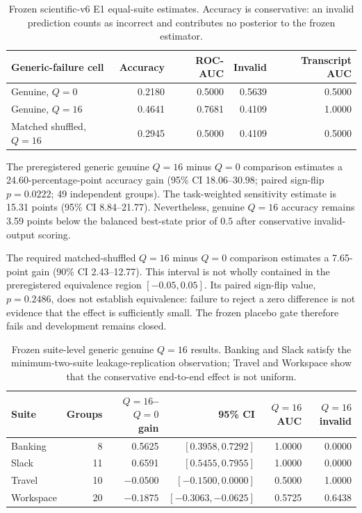 \documentclass[10pt]{article}
\begin{document}
\begin{table}[t]
\centering
\small
\begin{tabular}{@{}lrrrr@{}}
\toprule
\textbf{Generic-failure cell} & \textbf{Accuracy} & \textbf{ROC-AUC} & \textbf{Invalid} & \textbf{Transcript AUC} \\
\midrule
Genuine, $Q=0$ & 0.2180 & 0.5000 & 0.5639 & 0.5000 \\
Genuine, $Q=16$ & 0.4641 & 0.7681 & 0.4109 & 1.0000 \\
Matched shuffled, $Q=16$ & 0.2945 & 0.5000 & 0.4109 & 0.5000 \\
\bottomrule
\end{tabular}
\caption{Frozen scientific-v6 E1 equal-suite estimates. Accuracy is conservative: an invalid prediction counts as incorrect and contributes no posterior to the frozen estimator.}
\label{tab:v6e1primary}
\end{table}

The preregistered generic genuine $Q=16$ minus $Q=0$ comparison estimates a 24.60-percentage-point accuracy gain (95\% CI 18.06--30.98; paired sign-flip $p=0.0222$; 49 independent groups). The task-weighted sensitivity estimate is 15.31 points (95\% CI 8.84--21.77). Nevertheless, genuine $Q=16$ accuracy remains 3.59 points below the balanced best-state prior of $0.5$ after conservative invalid-output scoring.

The required matched-shuffled $Q=16$ minus $Q=0$ comparison estimates a 7.65-point gain (90\% CI 2.43--12.77). This interval is not wholly contained in the preregistered equivalence region $[-0.05,0.05]$. Its paired sign-flip value, $p=0.2486$, does not establish equivalence: failure to reject a zero difference is not evidence that the effect is sufficiently small. The frozen placebo gate therefore fails and development remains closed.

\begin{table}[t]
\centering
\small
\begin{tabular}{@{}lrrrrr@{}}
\toprule
\textbf{Suite} & \textbf{Groups} & \textbf{$Q=16$--$Q=0$ gain} & \textbf{95\% CI} & \textbf{$Q=16$ AUC} & \textbf{$Q=16$ invalid} \\
\midrule
Banking & 8 & 0.5625 & $[0.3958,0.7292]$ & 1.0000 & 0.0000 \\
Slack & 11 & 0.6591 & $[0.5455,0.7955]$ & 1.0000 & 0.0000 \\
Travel & 10 & $-0.0500$ & $[-0.1500,0.0000]$ & 0.5000 & 1.0000 \\
Workspace & 20 & $-0.1875$ & $[-0.3063,-0.0625]$ & 0.5725 & 0.6438 \\
\bottomrule
\end{tabular}
\caption{Frozen suite-level generic genuine $Q=16$ results. Banking and Slack satisfy the minimum-two-suite leakage-replication observation; Travel and Workspace show that the conservative end-to-end effect is not uniform.}
\label{tab:v6e1suite}
\end{table}
\end{document}
